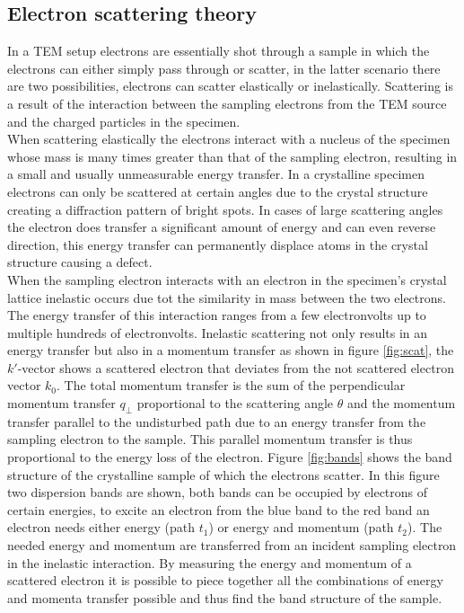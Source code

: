 \subsection{Electron scattering theory}
In a TEM setup electrons are essentially shot through a sample in which the electrons can either simply pass through or scatter, in the latter scenario there are two possibilities, electrons can scatter elastically or inelastically.
Scattering is a result of the interaction between the sampling electrons from the TEM source and the charged particles in the specimen.\\
When scattering elastically the electrons interact with a nucleus of the specimen whose mass is many times greater than that of the sampling electron, resulting in a small and usually unmeasurable energy transfer.
In a crystalline specimen electrons can only be scattered at certain angles due to the crystal structure creating a diffraction pattern of bright spots. In cases of large scattering angles the electron does transfer a significant amount of energy and can even reverse direction, this energy transfer can permanently displace atoms in the crystal structure causing a defect.\cite{Egerton_2008}\\
When the sampling electron interacts with an electron in the specimen's crystal lattice inelastic occurs due tot the similarity in mass between the two electrons. The energy transfer of this interaction ranges from a few electronvolts up to multiple hundreds of electronvolts.
Inelastic scattering not only results in an energy transfer but also in a momentum transfer as shown in figure \ref{fig:scat}, the $k'$-vector shows a scattered electron that deviates from the not scattered electron vector $k_0$.
The total momentum transfer is the sum of the perpendicular momentum transfer $q_{\perp}$ proportional to the scattering angle $\theta$ and the momentum transfer parallel to the undisturbed path due to an energy transfer from the sampling electron to the sample. This parallel momentum transfer is thus proportional to the energy loss of the electron.
Figure \ref{fig:bands} shows the band structure of the crystalline sample of which the electrons scatter. In this figure two dispersion bands are shown, both bands can be occupied by electrons of certain energies, to excite an electron from the blue band to the red band an electron needs either energy (path $t_1$) or energy and momentum (path $t_2$).
The needed energy and momentum are transferred from an incident sampling electron in the inelastic interaction. By measuring the energy and momentum of a scattered electron it is possible to piece together all the combinations of energy and momenta transfer possible and thus find the band structure of the sample.\\
